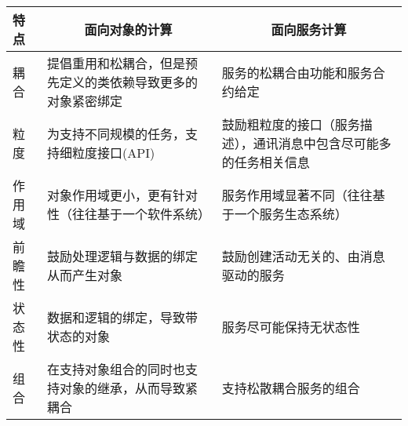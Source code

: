 \vspace{-0.5em}
\begin{spacing}{1.2}
    \centering
    \begin{longtable}{|m{1.2cm}<{\centering}|m{6.7cm}|m{6.7cm}|}
        \hline
\textbf{特点} & \multicolumn{1}{c|}{\textbf{面向对象的计算}} & \multicolumn{1}{c|}{\textbf{面向服务计算}} \\ \hline
耦合          & 提倡重用和松耦合，但是预先定义的类依赖导致更多的对象紧密绑定        & 服务的松耦合由功能和服务合约给定                     \\ \hline
粒度          & 为支持不同规模的任务，支持细粒度接口(API)               & 鼓励粗粒度的接口（服务描述），通讯消息中包含尽可能多的任务相关信息    \\ \hline
作用域         & 对象作用域更小，更有针对性（往往基于一个软件系统）             & 服务作用域显著不同（往往基于一个服务生态系统）              \\ \hline
前瞻性         & 鼓励处理逻辑与数据的绑定从而产生对象                    & 鼓励创建活动无关的、由消息驱动的服务                  \\ \hline
状态性         & 数据和逻辑的绑定，导致带状态的对象                     & 服务尽可能保持无状态性                          \\ \hline
组合          & 在支持对象组合的同时也支持对象的继承，从而导致紧耦合            & 支持松散耦合服务的组合                          \\ \hline
    \end{longtable}
\end{spacing}
\vspace{-0.5em}